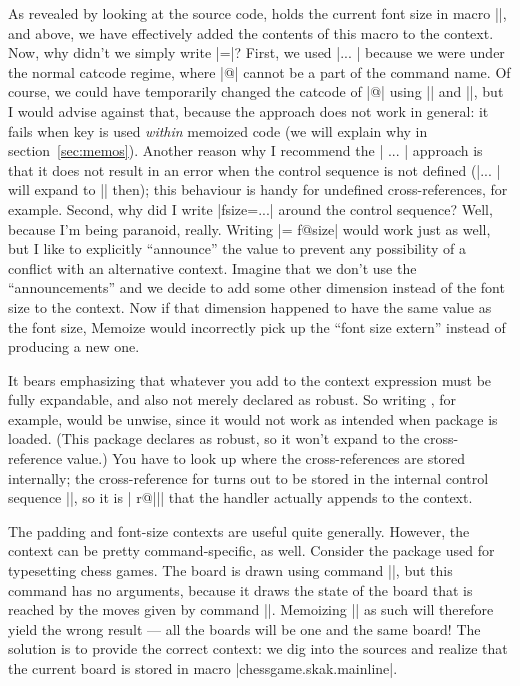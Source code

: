 \documentclass[a4paper,11pt]{article}
\begin{document}
As revealed by looking at the  source code,  holds
the current font size in macro |\f@size|, and above, we have effectively added
the contents of this macro to the context.  Now, why didn't we simply write
|=\f@size|?  First, we used |\csname ... \endcsname| because we
were under the normal  catcode regime, where |@| cannot be a part
of the command name.  Of course, we could have temporarily changed the catcode
of |@| using |\makeatletter| and |\makeatother|, but I would advise against
that, because the approach does not work in general: it fails when key
 is used \emph{within} memoized code (we will explain why in
section~\ref{sec:memos}).  Another reason why I recommend the |\csname
... \endcsname| approach is that it does not result in an error when the
control sequence is not defined (|\csname ... \endcsname| will expand to
|\relax| then); this behaviour is handy for undefined cross-references, for
example.  Second, why did I write |fsize={...}| around the control sequence?
Well, because I'm being paranoid, really.  Writing |={\csname
  f@size\endcsname}| would work just as well, but I like to explicitly
``announce'' the value to prevent any possibility of a conflict with an
alternative context.  Imagine that we don't use the ``announcements'' and we
decide to add some other dimension instead of the font size to the context.
Now if that dimension happened to have the same value as the font size, Memoize
would incorrectly pick up the ``font size extern'' instead of producing a new
one.

It bears emphasizing that whatever you add to the context expression must be
fully expandable, and also not merely declared as robust.  So writing
, for example, would be unwise, since
it would not work as intended when package  is loaded.  (This
package declares  as robust, so it won't expand to the
cross-reference value.)  You have to look up where the cross-references are
stored internally; the cross-reference for  turns out to be stored in
the internal control sequence |\r@|, so it is |\csname
r@||\endcsname| that the  handler actually appends to
the context.

The padding and font-size contexts are useful quite generally.  However, the
context can be pretty command-specific, as well.  Consider the 
package used for typesetting chess games.  The board is drawn using command
|\showboard|, but this command has no arguments, because it draws the state of
the board that is reached by the moves given by command |\mainline|.  Memoizing
|\showboard| as such will therefore yield the wrong result --- all the boards
will be one and the same board!  The solution is to provide the correct
context: we dig into the  sources and realize that the current
board is stored in macro |\csname chessgame.skak.mainline\endcsname|.
\end{document}
